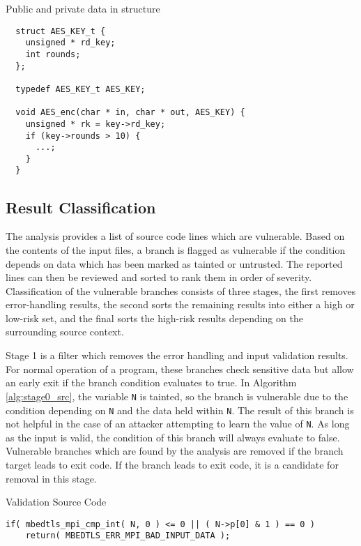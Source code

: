 \documentclass[11pt,a4paper]{article}
\begin{document}
\begin{algorithm}
  \caption{Public and private data in structure}
  \label{alg:aes_struclt}
  \begin{lstlisting}
  struct AES_KEY_t {
    unsigned * rd_key;
    int rounds;
  };

  typedef AES_KEY_t AES_KEY;

  void AES_enc(char * in, char * out, AES_KEY) {
    unsigned * rk = key->rd_key;
    if (key->rounds > 10) {
      ...;
    }
  }
  \end{lstlisting}
\end{algorithm}

\subsection{Result Classification}

The analysis provides a list of source code lines which are vulnerable. Based on
the contents of the input files, a branch is flagged as vulnerable if the
condition depends on data which has been marked as tainted or untrusted. The
reported lines can then be reviewed and sorted to rank them in order of
severity. Classification of the vulnerable branches consists of three stages,
the first removes error-handling results, the second sorts the remaining results
into either a high or low-risk set, and the final sorts the high-risk results
depending on the surrounding source context.

Stage 1 is a filter which removes the error handling and input validation
results. For normal operation of a program, these branches check sensitive
data but allow an early exit if the branch condition evaluates to true. In
Algorithm \ref{alg:stage0_src}, the variable \texttt{N} is tainted, so the branch is
vulnerable due to the condition depending on \texttt{N} and the data held within
\texttt{N}. The result of this branch is not helpful in the case of an attacker
attempting to learn the value of \texttt{N}. As long as the input is valid, the
condition of this branch will always evaluate to false. Vulnerable branches
which are found by the analysis are removed if the branch target leads to exit
code. If the branch leads to exit code, it is a candidate for removal in this stage.

\begin{algorithm}
\caption{Validation Source Code}
\begin{lstlisting}
if( mbedtls_mpi_cmp_int( N, 0 ) <= 0 || ( N->p[0] & 1 ) == 0 )
    return( MBEDTLS_ERR_MPI_BAD_INPUT_DATA );
\end{lstlisting}
\label{alg:stage0_src}
\end{algorithm}
\end{document}
